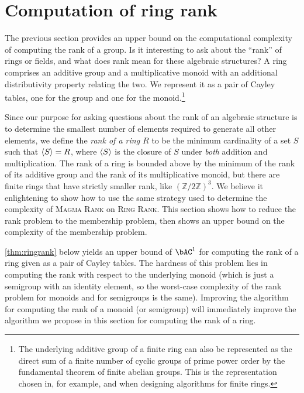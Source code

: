 \section{Computation of ring rank}

%
The previous section provides an upper bound on the computational complexity of computing the rank of a group.
Is it interesting to ask about the ``rank'' of rings or fields, and what does rank mean for these algebraic structures?
A ring comprises an additive group and a multiplicative monoid with an additional distributivity property relating the two.
We represent it as a pair of Cayley tables, one for the group and one for the monoid.\footnote{
  The underlying additive group of a finite ring can also be represented as the direct sum of a finite number of cyclic groups of prime power order by the fundamental theorem of finite abelian groups.
  This is the representation chosen in, for example, \autocite{av05} and \autocite{ks06}  when designing algorithms for finite rings.
}

Since our purpose for asking questions about the rank of an algebraic structure is to determine the smallest number of elements required to generate all other elements, we define the \emph{rank of a ring $R$} to be the minimum cardinality of a set $S$ such that $\langle S \rangle = R$, where $\langle S \rangle$ is the closure of $S$ under \emph{both} addition and multiplication.
The rank of a ring is bounded above by the minimum of the rank of its additive group and the rank of its multiplicative monoid, but there are finite rings that have strictly smaller rank, like $(\mathbb{Z} / 2 \mathbb{Z})^3$.
We believe it enlightening to show how to use the same strategy used to determine the complexity of \textsc{Magma Rank} on \textsc{Ring Rank}.
This section shows how to reduce the rank problem to the membership problem, then shows an upper bound on the complexity of the membership problem.

%
\autoref{thm:ringrank} below yields an upper bound of $\bAC^1$ for computing the rank of a ring given as a pair of Cayley tables.
The hardness of this problem lies in computing the rank with respect to the underlying monoid (which is just a semigroup with an identity element, so the worst-case complexity of the rank problem for monoids and for semigroups is the same).
Improving the algorithm for computing the rank of a monoid (or semigroup) will immediately improve the algorithm we propose in this section for computing the rank of a ring.

